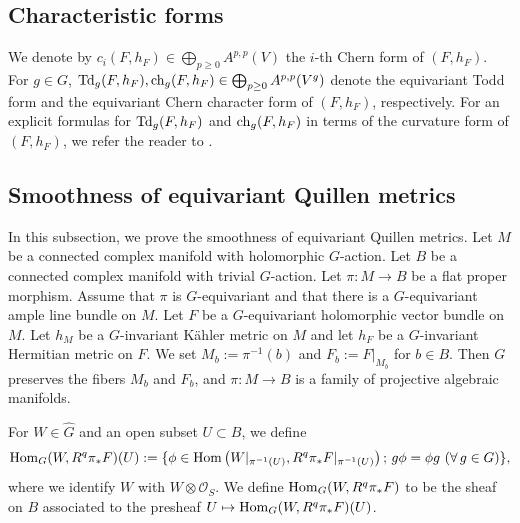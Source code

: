 \documentclass[amscd, leqno]{amsart}
\theoremstyle{plain}
\theoremstyle{definition}
\theoremstyle{remark}
\begin{document}
\subsection
{\bf Characteristic forms}
\label{sect:1.2}
\par
We denote by $c_{i}(F,h_{F}) \in \bigoplus_{p\geq0}A^{p,p}(V)$ the $i$-th Chern form of $(F,h_{F})$.
For $g \in G$, ${\rm Td}_{g}(F, h_{F}),{\rm ch}_{g}(F,h_{F}) \in \bigoplus_{p\geq0}A^{p,p}(V^{g})$ denote
the equivariant Todd form and the equivariant Chern character form of $(F,h_{F})$, respectively. 
For an explicit formulas for ${\rm Td}_{g}(F, h_{F})$ and ${\rm ch}_{g}(F,h_{F})$ in terms of the curvature form of $(F,h_{F})$,
we refer the reader to \cite[Def.\,2.4]{Bismut95}. 




\subsection
{\bf Smoothness of equivariant Quillen metrics}
\label{sect:1.3}
\par
In this subsection, we prove the smoothness of equivariant Quillen metrics.
Let $M$ be a connected complex manifold with holomorphic $G$-action. Let $B$ be a connected complex manifold with trivial $G$-action.
Let $\pi \colon M \to B$ be a flat proper morphism. 
Assume that $\pi$ is $G$-equivariant and that there is a $G$-equivariant ample line bundle on $M$. 
Let $F$ be a $G$-equivariant holomorphic vector bundle on $M$. 
Let $h_{M}$ be a $G$-invariant K\"ahler metric on $M$ and let $h_{F}$ be a $G$-invariant Hermitian metric on $F$. 
We set $M_{b}:=\pi^{-1}(b)$ and $F_{b}:=F|_{M_{b}}$ for $b\in B$. 
Then $G$ preserves the fibers $M_{b}$ and $F_{b}$, and $\pi \colon M\to B$ is a family of projective algebraic manifolds.
\par
For $W\in\widehat{G}$ and an open subset $U \subset B$, we define 
$$
{\rm Hom}_{G}(W,R^{q}\pi_{*}F)(U) 
:= \{ \phi \in {\rm Hom}\left( W|_{\pi^{-1}(U)} , R^{q}\pi_{*}F|_{\pi^{-1}(U)}\right) ;\, g \phi = \phi g \,\,(\forall\, g \in G)\},
$$
where we identify $W$ with $W \otimes {\mathcal O}_{S}$. We define
${\rm Hom}_{G}(W,R^{q}\pi_{*}F)$ to be the sheaf on $B$ associated to the presheaf
$U \mapsto {\rm Hom}_{G}(W,R^{q}\pi_{*}F)(U)$.
\end{document}
